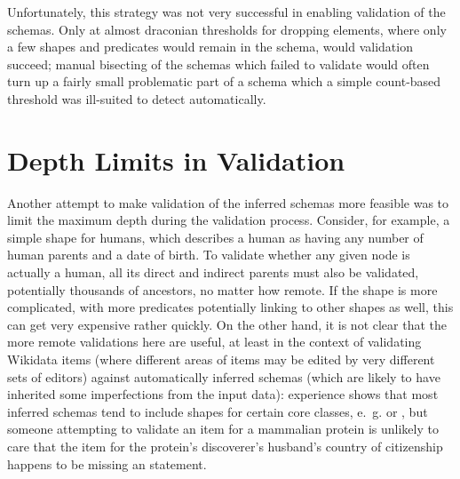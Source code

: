 Unfortunately, this strategy was not very successful in enabling validation of the schemas.
Only at almost draconian thresholds for dropping elements,
where only a few shapes and predicates would remain in the schema,
would validation succeed;
manual bisecting of the schemas which failed to validate
would often turn up a fairly small problematic part of a schema
which a simple count-based threshold was ill-suited to detect automatically.

\section{Depth Limits in Validation}
\label{sec:RDF2Graph+Wikidata:depth-limit}

Another attempt to make validation of the inferred schemas more feasible
was to limit the maximum depth during the validation process. %
Consider, for example, a simple shape for humans, %
which describes a human as having any number of human parents and a date of birth.
To validate whether any given node is actually a human,
all its direct and indirect parents must also be validated,
potentially thousands of ancestors, no matter how remote.
If the shape is more complicated,
with more predicates potentially linking to other shapes as well,
this can get very expensive rather quickly.
On the other hand, it is not clear that the more remote validations here are useful,
at least in the context of validating Wikidata items
(where different areas of items may be edited by very different sets of editors)
against automatically inferred schemas
(which are likely to have inherited some imperfections from the input data): %
experience shows that %
most inferred schemas tend to include shapes for certain core classes,
e.~g.  or ,
but someone attempting to validate an item for a mammalian protein
is unlikely to care that the item for the protein’s discoverer’s husband’s country of citizenship %
happens to be missing an  statement.


